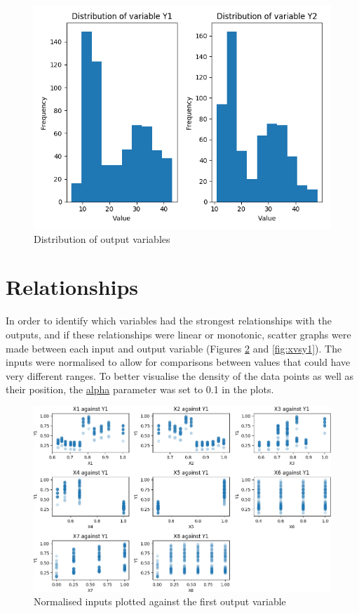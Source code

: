 \documentclass[12pt]{article}
\begin{document}
\begin{figure}[!ht]
\centering
\includegraphics[width=0.8 \linewidth]{images/YDist}
\caption{Distribution of output variables}
\label{fig:ydist}
\end{figure}

\FloatBarrier

\section{Relationships}

In order to identify which variables had the strongest relationships with the outputs, and if these relationships were linear or monotonic, scatter graphs were made between each input and output variable (Figures \ref{fig:xvsy0} and \ref{fig:xvsy1}). The inputs were normalised to allow for comparisons between values that could have very different ranges. To better visualise the density of the data points as well as their position, the \url{alpha} parameter was set to 0.1 in the plots. 

\begin{figure}[!ht]
\centering
\includegraphics[width=0.8 \linewidth]{images/XsVsY0}
\caption{Normalised inputs plotted against the first output variable}
\label{fig:xvsy0}
\end{figure}
\end{document}
